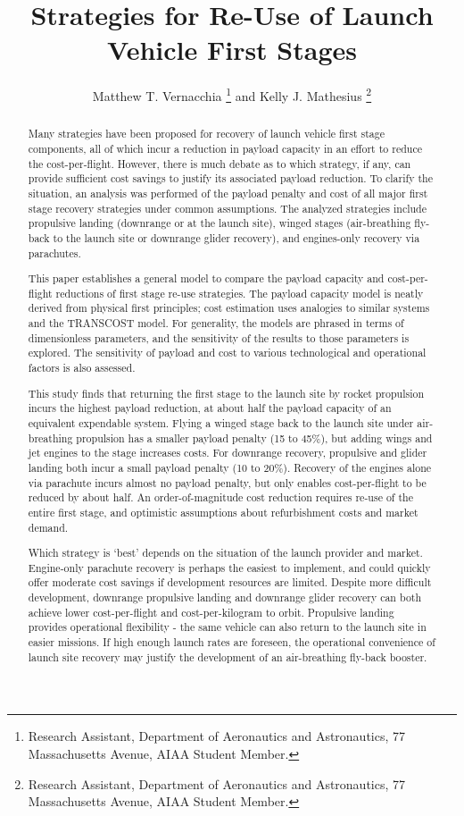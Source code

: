 \documentclass[conf]{new-aiaa}
\title{Strategies for Re-Use of Launch Vehicle First Stages}
\author{Matthew T. Vernacchia \footnote{Research Assistant, Department of Aeronautics and Astronautics, 77 Massachusetts Avenue, AIAA Student Member.}
and Kelly J. Mathesius  \footnote{Research Assistant, Department of Aeronautics and Astronautics, 77 Massachusetts Avenue, AIAA Student Member.}}
\affil{Massachusetts Institute of Technology, Cambridge, MA, 02139}
\begin{document}
\maketitle

\begin{abstract}
Many strategies have been proposed for recovery of launch vehicle first stage components, all of which incur a reduction in payload capacity in an effort to reduce the cost-per-flight.
However, there is much debate as to which strategy, if any, can provide sufficient cost savings to justify its associated payload reduction. To clarify the situation, an analysis was performed of the payload penalty and cost of all major first stage recovery strategies under common assumptions. The analyzed strategies include propulsive landing (downrange or at the launch site), winged stages (air-breathing fly-back to the launch site or downrange glider recovery), and engines-only recovery via parachutes.

This paper establishes a general model to compare the payload capacity and cost-per-flight reductions of first stage re-use strategies.
The payload capacity model is neatly derived from physical first principles; cost estimation uses analogies to similar systems and the TRANSCOST model. For generality, the models are phrased in terms of dimensionless parameters, and the sensitivity of the results to those parameters is explored.
The sensitivity of payload and cost to various technological and operational factors is also assessed.

This study finds that returning the first stage to the launch site by rocket propulsion incurs the highest payload reduction, at about half the payload capacity of an equivalent expendable system.  Flying a winged stage back to the launch site under air-breathing propulsion has a smaller payload penalty (15 to 45\%), but adding wings and jet engines to the stage increases costs. For downrange recovery, propulsive and glider landing both incur a small payload penalty  (10 to 20\%). Recovery of the engines alone via parachute incurs almost no payload penalty, but only enables cost-per-flight to be reduced by about half. An order-of-magnitude cost reduction requires re-use of the entire first stage, and optimistic assumptions about refurbishment costs and market demand.

Which strategy is `best' depends on the situation of the launch provider and market. Engine-only parachute recovery is perhaps the easiest to implement, and could quickly offer moderate cost savings if development resources are limited. Despite more difficult development, downrange propulsive landing and downrange glider recovery can both achieve lower cost-per-flight and cost-per-kilogram to orbit. Propulsive landing provides operational flexibility - the same vehicle can also return to the launch site in easier missions. If high enough launch rates are foreseen, the operational convenience of launch site recovery may justify the development of an air-breathing fly-back booster.




\end{abstract}
\end{document}
